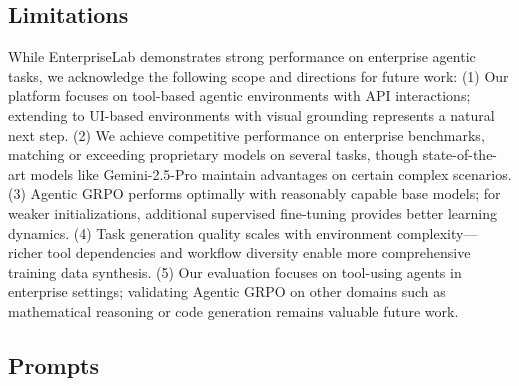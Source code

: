 \documentclass{article}
\theoremstyle{plain}
\theoremstyle{definition}
\theoremstyle{remark}
\begin{document}
\subsection{Limitations}
\label{app:lim}

While EnterpriseLab demonstrates strong performance on enterprise agentic tasks, we acknowledge the following scope and directions for future work: (1) Our platform focuses on tool-based agentic environments with API interactions; extending to UI-based environments with visual grounding represents a natural next step. (2) We achieve competitive performance on enterprise benchmarks, matching or exceeding proprietary models on several tasks, though state-of-the-art models like Gemini-2.5-Pro maintain advantages on certain complex scenarios. (3) Agentic GRPO performs optimally with reasonably capable base models; for weaker initializations, additional supervised fine-tuning provides better learning dynamics. (4) Task generation quality scales with environment complexity—richer tool dependencies and workflow diversity enable more comprehensive training data synthesis. (5) Our evaluation focuses on tool-using agents in enterprise settings; validating Agentic GRPO on other domains such as mathematical reasoning or code generation remains valuable future work.



\subsection{Prompts}
\label{app:prompt}
\end{document}
